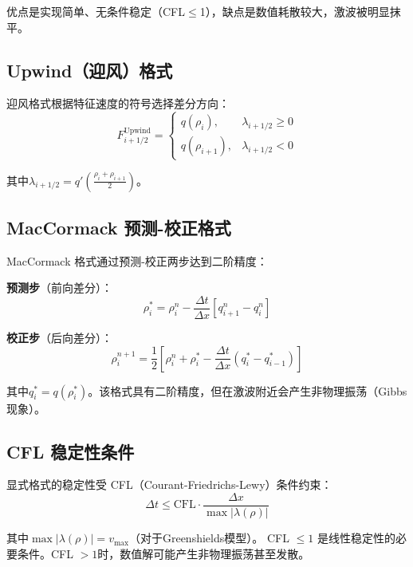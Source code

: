 \documentclass[12pt,a4paper]{ctexart}
\begin{document}
优点是实现简单、无条件稳定（CFL$\le$1），缺点是数值耗散较大，激波被明显抹平。

\subsection{Upwind（迎风）格式}

迎风格式根据特征速度的符号选择差分方向：
\begin{equation}
    F_{i+1/2}^{\text{Upwind}} = \begin{cases}
        q(\rho_i), & \lambda_{i+1/2} \ge 0 \\
        q(\rho_{i+1}), & \lambda_{i+1/2} < 0
    \end{cases}
\end{equation}

其中$\lambda_{i+1/2} = q'\left(\frac{\rho_i + \rho_{i+1}}{2}\right)$。

\subsection{MacCormack 预测-校正格式}

MacCormack 格式通过预测-校正两步达到二阶精度：

\textbf{预测步}（前向差分）：
\begin{equation}
    \rho_i^* = \rho_i^n - \frac{\Delta t}{\Delta x}\left[q_{i+1}^n - q_i^n\right]
\end{equation}

\textbf{校正步}（后向差分）：
\begin{equation}
    \rho_i^{n+1} = \frac{1}{2}\left[\rho_i^n + \rho_i^* - \frac{\Delta t}{\Delta x}\left(q_i^* - q_{i-1}^*\right)\right]
\end{equation}

其中$q_i^* = q(\rho_i^*)$。该格式具有二阶精度，但在激波附近会产生非物理振荡（Gibbs 现象）。

\subsection{CFL 稳定性条件}

显式格式的稳定性受 CFL（Courant-Friedrichs-Lewy）条件约束：
\begin{equation}
    \Delta t \le \text{CFL} \cdot \frac{\Delta x}{\max|\lambda(\rho)|}
    \label{eq:cfl}
\end{equation}

其中$\max|\lambda(\rho)| = v_{\max}$（对于Greenshields模型）。
CFL $\le 1$ 是线性稳定性的必要条件。CFL $> 1$时，数值解可能产生非物理振荡甚至发散。
\end{document}
